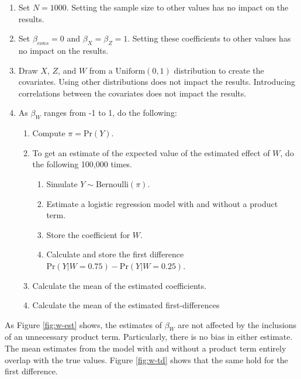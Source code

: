 \documentclass[12pt]{article}
\begin{document}
\begin{appendix}
\begin{enumerate}
\item Set $N = 1000$. Setting the sample size to other values has no impact on the results.
\item Set $\beta_{cons} = 0$ and $\beta_X = \beta_Z = 1$. Setting these coefficients to other values has no impact on the results.
\item Draw $X$, $Z$, and $W$ from a $\text{Uniform}(0, 1)$ distribution to create the covariates. Using other distributions does not impact the results. Introducing correlations between the covariates does not impact the results.
\item As $\beta_W$ ranges from -1 to 1, do the following:
	\begin{enumerate}
	\item Compute $\pi = \text{Pr}(Y)$.
	\item To get an estimate of the expected value of the estimated effect of $W$, do the following 100,000 times.
		\begin{enumerate}
		\item Simulate $Y \sim \text{Bernoulli}(\pi)$.
		\item Estimate a logistic regression model with and without a product term.
		\item Store the coefficient for $W$.
		\item Calculate and store the first difference $\text{Pr}(Y | W = 0.75) - \text{Pr}(Y | W = 0.25)$.
		
		\end{enumerate}
	\item Calculate the mean of the estimated coefficients.
	\item Calculate the mean of the estimated first-differences
	\end{enumerate}
\end{enumerate}

As Figure \ref{fig:w-est} shows, the estimates of $\beta_W$ are not affected by the inclusions of an unnecessary product term. Particularly, there is no bias in either estimate. The mean estimates from the model with and without a product term entirely overlap with the true values. Figure \ref{fig:w-td} shows that the same hold for the first difference.


\end{appendix}
\end{document}
